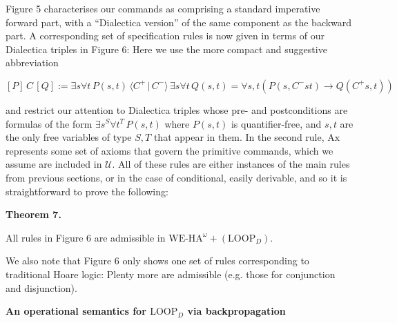Figure 5 characterises our commands as comprising a standard imperative forward part, with a “Dialectica version” of the same component as the backward part. A corresponding set of specification rules is now given in terms of our Dialectica triples in Figure 6: Here we use the more compact and suggestive abbreviation\par
  
\par  \quad  \[[{P}]\,{C}\,[{Q}]:={\exists s\forall t\,P(s,t)}\,{\langle{C^{+}}\,|\,{C^{-}}\rangle}\,{\exists s\forall t\,Q(s,t)}=\forall s,t\left(P(s,C^{-}st)\to Q(C^{+}s,t)\right)\]\quad  \quad  
  
and restrict our attention to Dialectica triples whose pre- and postconditions are formulas of the form $\exists s^{S}\forall t^{T}\,P(s,t)$ where $P(s,t)$ is quantifier-free, and $s,t$ are the only free variables of type $S,T$ that appear in them. In the second rule, $\mathrm{Ax}$ represents some set of axioms that govern the primitive commands, which we assume are included in $\mathcal{U}$. All of these rules are either instances of the main rules from previous sections, or in the case of conditional, easily derivable, and so it is straightforward to prove the following:\par
 
 
 
\par\medskip\noindent\textbf{Theorem 7.}\par
 
 
All rules in Figure 6 are admissible in $\mathrm{WE}\mbox{-}\mathrm{HA}^{\omega}+(\mathrm{LOOP}_{D})$.\par
 
 
 
 
We also note that Figure 6 only shows one set of rules corresponding to traditional Hoare logic: Plenty more are admissible (e.g. those for conjunction and disjunction).\par
 
 
 
\par\medskip\noindent\textbf{An operational semantics for $\mathrm{LOOP}_{D}$ via backpropagation}\par
 
